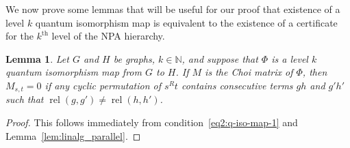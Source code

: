 \documentclass[11pt,a4paper]{article}
\theoremstyle{plain}
\newtheorem{lem}[thm]{Lemma}
\theoremstyle{remark}
\theoremstyle{definition}
\DeclareMathOperator{\rel}{rel}
\begin{document}
We now prove some lemmas that will be useful for our proof that existence of a level $k$ quantum isomorphism map is equivalent to the existence of a certificate for the $k^\text{th}$ level of the NPA hierarchy.

\begin{lem}\label{lem:Mzeros}
    Let $G$ and $H$ be graphs, $k \in \mathbb{N}$, and suppose that $\Phi$ is a level $k$ quantum isomorphism map from $G$ to $H$. If $M$ is the Choi matrix of $\Phi$, then $M_{s,t} = 0$ if any cyclic permutation of $s^Rt$ contains consecutive terms $gh$ and $g'h'$ such that $\rel(g,g') \ne \rel(h,h')$.
\end{lem}
\begin{proof}
    This follows immediately from condition~\eqref{eq2:q-iso-map-1} and Lemma~\ref{lem:linalg_parallel}.
\end{proof}
\end{document}
